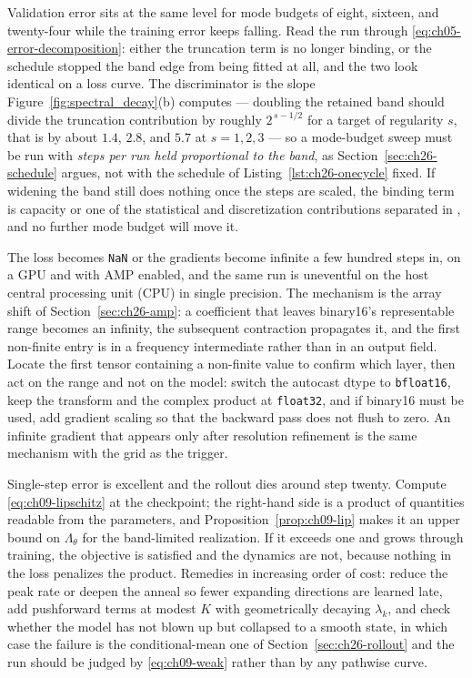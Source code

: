 Validation error sits at the same level for mode budgets of eight, sixteen, and twenty-four
while the training error keeps falling. Read the run through
\eqref{eq:ch05-error-decomposition}: either the truncation term is no longer binding, or the
schedule stopped the band edge from being fitted at all, and the two look identical on a loss
curve. The discriminator is the slope Figure~\ref{fig:spectral_decay}(b) computes --- doubling
the retained band should divide the truncation contribution by roughly $2^{\,s-1/2}$ for a
target of regularity $s$, that is by about $1.4$, $2.8$, and $5.7$ at $s = 1, 2, 3$ --- so a
mode-budget sweep must be run with \emph{steps per run held proportional to the band}, as
Section~\ref{sec:ch26-schedule} argues, not with the schedule of
Listing~\ref{lst:ch26-onecycle} fixed. If widening the band still does
nothing once the steps are scaled, the binding term is capacity or one of the statistical and
discretization contributions separated in \cite{subedi2024controlling}, and no further mode
budget will move it.

The loss becomes \texttt{NaN} or the gradients become infinite a few hundred steps in, on a
GPU and with AMP enabled, and the same run is uneventful on the host central processing
unit (CPU) in single precision. The
mechanism is the array shift of Section~\ref{sec:ch26-amp}: a coefficient that leaves
binary16's representable range becomes an infinity, the subsequent contraction propagates it,
and the first non-finite entry is in a frequency intermediate rather than in an output field.
Locate the first tensor containing a non-finite value to confirm which layer, then act on the
range and not on the model: switch the autocast dtype to \texttt{bfloat16}, keep the transform
and the complex product at \texttt{float32}, and if binary16 must be used, add gradient
scaling so that the backward pass does not flush to zero. An infinite gradient that appears
only after resolution refinement is the same mechanism with the grid as the trigger.

Single-step error is excellent and the rollout dies around step twenty. Compute
\eqref{eq:ch09-lipschitz} at the checkpoint; the right-hand side is a product of quantities
readable from the parameters, and Proposition~\ref{prop:ch09-lip} makes it an upper bound on
$\Lambda_\theta$ for the band-limited realization. If it exceeds one and grows through
training, the objective is satisfied and the dynamics are not, because nothing in the loss
penalizes the product. Remedies in increasing order of cost: reduce the peak rate or deepen
the anneal so fewer expanding directions are learned late, add pushforward terms at modest
$K$ with geometrically decaying $\lambda_k$, and check whether the model has not blown up but
collapsed to a smooth state, in which case the failure is the conditional-mean one of
Section~\ref{sec:ch26-rollout} and the run should be judged by \eqref{eq:ch09-weak} rather
than by any pathwise curve. 

